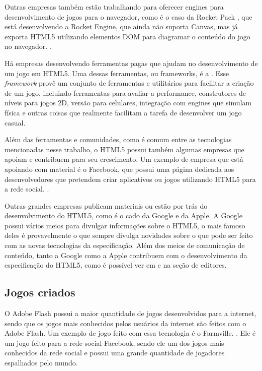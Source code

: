 Outras empresas também estão trabalhando para oferecer engines para
desenvolvimento de jogos para o navegador, como é o caso da Rocket
Pack \cite{website:rocketpack}, que está desenvolvendo a Rocket Engine,
que ainda não suporta Canvas, mas já
exporta HTML5 utilizando elementos DOM para diagramar o conteúdo do
jogo no navegador. \cite{website:rocketengine}.

Há empresas desenvolvendo ferramentas pagas que ajudam no
desenvolvimento de um jogo em HTML5. Uma dessas ferramentas, ou
frameworks, é a . Esse \textit{framework}
provê um conjunto de ferramentas e utilitários para facilitar a
criação de um jogo, incluindo ferramentas para avaliar a performance,
construtores de níveis para jogos 2D, versão para celulares,
integração com engines que simulam física e outras coisas que
realmente facilitam a tarefa de desenvolver um jogo casual.

Além das ferramentas e comunidades, como é comum entre as tecnologias
mencionadas nesse trabalho, o HTML5 possui também algumas empresas que
apoiam e contribuem para seu crescimento. Um exemplo de empresa que
está apoiando com material é o Facebook, que possui uma página
dedicada aos desenvolvedores que pretendem criar aplicativos ou jogos
utilizando HTML5 para a rede social. \cite{website:facebookhtml5}.

Outras grandes empresas publicam materiais ou estão por trás do
desenvolvimento do HTML5, como é o cado da Google e da Apple. A Google
possui vários meios para divulgar informações sobre o HTML5, o mais
famoso deles é provavelmente o  que
sempre divulga novidades sobre o que pode ser feito com as novas
tecnologias da especificação. Além dos meios de comunicação de
conteúdo, tanto a Google como a Apple contribuem com o desenvolvimento
da especificação do HTML5, como é possível ver em
 e  na
seção de editores.

\subsection{Jogos criados}

O Adobe Flash possui a maior quantidade de jogos desenvolvidos para a
internet, sendo que os jogos mais conhecidos pelos usuários da
internet são feitos com o Adobe Flash. Um exemplo de jogo feito com
essa tecnologia é o Farmville. \cite{website:farmville}. Ele é um jogo
feito para a rede social Facebook, sendo ele um dos jogos mais
conhecidos da rede social e  possui uma grande quantidade de
jogadores espalhados pelo mundo.

